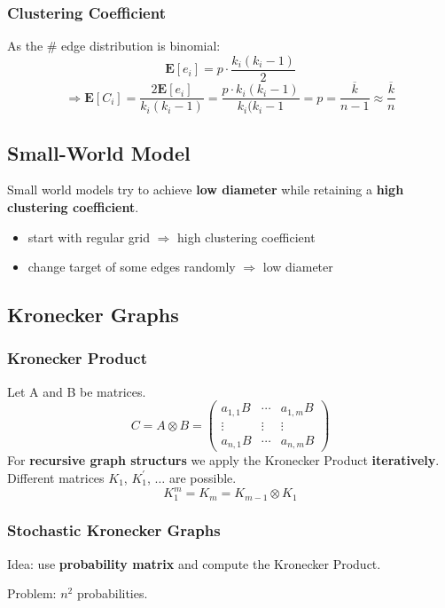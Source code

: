 \documentclass[parskip=full]{scrartcl}
\begin{document}
\subsubsection{Clustering Coefficient}
As the \# edge distribution is binomial:
\[\mathbf{E}[e_i] = p \cdot \frac{k_i(k_i - 1)}{2}\]
\[\Longrightarrow \mathbf{E}[C_i] = \frac{2\mathbf{E}[e_i]}{k_i(k_i-1)} = \frac{p \cdot k_i(k_i-1)}{k_i(k_i-1} = p = \frac{\overline{k}}{n-1} \approx \frac{\overline{k}}{n}\]

\subsection{Small-World Model}
Small world models try to achieve \textbf{low diameter} while retaining a \textbf{high clustering coefficient}.
\begin{itemize}
	\item start with regular grid $\Rightarrow$ high clustering coefficient
	\item change target of some edges randomly $\Rightarrow$ low diameter
\end{itemize}

\subsection{Kronecker Graphs \cite{leskovec2009kronecker}}

\subsubsection{Kronecker Product}
Let A and B be matrices.
\[C = A \otimes B = 
\begin{pmatrix}
a_{1,1}B & \cdots & a_{1,m}B \\
\vdots & \vdots & \vdots \\
a_{n,1}B & \cdots & a_{n,m}B
\end{pmatrix}\]
For \textbf{recursive graph structurs} we apply the Kronecker Product \textbf{iteratively}. Different matrices $K_1$, $K_1^{'}$, $\ldots$ are possible.
\[K_1^{m} = K_m = K_{m-1} \otimes K_1\]

\subsubsection{Stochastic Kronecker Graphs}
Idea: use \textbf{probability matrix} and compute the Kronecker Product.

Problem: $n^2$ probabilities.
\end{document}
